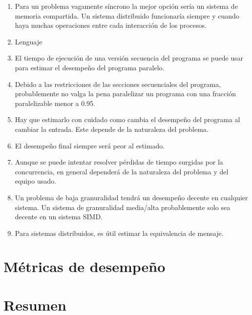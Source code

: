 \begin{enumerate}
    \item Para un problema vagamente síncrono la mejor opción sería un sistema
    de memoria compartida. Un sistema distribuido funcionaría siempre y cuando
    haya muchas operaciones entre cada interacción de los procesos.
    
    \item Lenguaje
    
    \item El tiempo de ejecución de una versión secuencia del programa se puede
    usar para estimar el desempeño del programa paralelo.
    
    \item Debido a las restricciones de las secciones secuenciales del programa,
    probablemente no valga la pena paralelizar un programa con una fracción
    paralelizable menor a 0.95.
    
    \item Hay que estimarlo con cuidado como cambia el desempeño del programa
    al cambiar la entrada. Este depende de la naturaleza del problema.
    
    \item El desempeño final siempre será peor al estimado.
    
    \item Aunque se puede intentar resolver pérdidas de tiempo surgidas por la
    concurrencia, en general dependerá de la naturaleza del problema y del
    equipo usado.
    
    \item Un problema de baja granuralidad tendrá un desempeño decente en
    cualquier sistema. Un sistema de granuralidad media/alta probablemente solo
    sea decente en un sistema SIMD.
    
    \item Para sistemas distribuidos, es útil estimar la equivalencia de
    mensaje.
    
\end{enumerate}

\section{Métricas de desempeño}

\section{Resumen}
